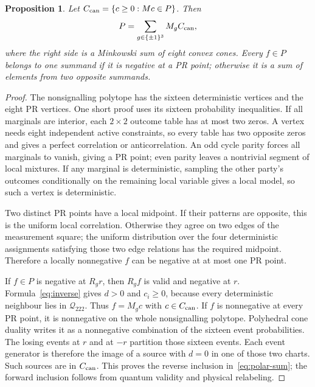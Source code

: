 \documentclass[11pt]{article}
\newtheorem{proposition}{Proposition}
\begin{document}
\begin{proposition}\label{prop:polar-cover}
Let $C_{\rm can}=\{c\ge0:Mc\in P\}$. Then
\begin{equation}
                     P=\sum_{g\in\{\pm1\}^3}M_gC_{\rm can},    \label{eq:polar-sum}
\end{equation}
where the right side is a Minkowski sum of eight convex cones.
Every $f\in P$ belongs to one summand if it is negative at a PR point;
otherwise it is a sum of elements from two opposite summands.
\end{proposition}
\begin{proof}
The nonsignalling polytope has the sixteen deterministic vertices and
the eight PR vertices. One short proof uses its sixteen probability
inequalities. If all marginals are interior, each $2\times2$ outcome
table has at most two zeros. A vertex needs eight independent active
constraints, so every table has two opposite zeros and gives a perfect
correlation or anticorrelation. An odd cycle parity forces all marginals
to vanish, giving a PR point; even parity leaves a nontrivial segment
of local mixtures. If any marginal is deterministic, sampling the other
party's outcomes conditionally on the remaining local variable gives
a local model, so such a vertex is deterministic.

Two distinct PR points have a local midpoint. If their patterns are
opposite, this is the uniform local correlation. Otherwise they agree
on two edges of the measurement square; the uniform distribution over
the four deterministic assignments satisfying those two edge relations
has the required midpoint. Therefore a locally nonnegative $f$ can be
negative at at most one PR point.

If $f\in P$ is negative at $R_gr$, then $R_gf$ is valid and negative
at $r$. Formula~\eqref{eq:inverse} gives $d>0$ and $c_i\ge0$, because
every deterministic neighbour lies in $\mathcal Q_{222}$. Thus
$f=M_gc$ with $c\in C_{\rm can}$.
If $f$ is nonnegative at every PR point, it is nonnegative on the
whole nonsignalling polytope. Polyhedral cone duality writes it as
a nonnegative combination of the sixteen event probabilities.
The losing events at $r$ and at $-r$ partition those sixteen events.
Each event generator is therefore the image of a source with $d=0$
in one of those two charts. Such sources are in $C_{\rm can}$.
This proves the reverse inclusion in~\eqref{eq:polar-sum}; the forward
inclusion follows from quantum validity and physical relabeling.
\end{proof}
\end{document}
